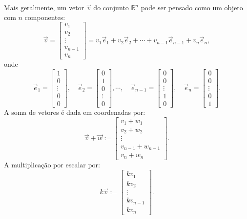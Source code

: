 \documentclass[../livro.tex]{subfiles}  %
\begin{document}
Mais geralmente, um vetor $\vec{v}$ do conjunto $\mathbb{R}^n$ pode ser pensado como um objeto com $n$ componentes:
\begin{equation}
\vec{v} =
\left[
  \begin{array}{c}
    v_1 \\
    v_2 \\
   \vdots \\
    v_{n-1} \\
    v_n
  \end{array}
\right]
= v_1 \vec{e}_1 + v_2 \vec{e}_2 + \cdots + v_{n-1} \vec{e}_{n-1} + v_{n} \vec{e}_{n},
\end{equation} onde
\begin{equation}
\vec{e}_1 =
\left[
  \begin{array}{c}
    1 \\
    0 \\
  \vdots \\
    0 \\
    0
  \end{array}
\right], \quad
\vec{e}_2 =
\left[
  \begin{array}{c}
    0 \\
    1 \\
    0 \\
  \vdots \\
    0
  \end{array}
\right],   \cdots, \quad
\vec{e}_{n-1} =
\left[
  \begin{array}{c}
    0 \\
    0 \\
  \vdots \\
    1 \\
    0
  \end{array}
\right], \quad
\vec{e}_n =
\left[
  \begin{array}{c}
    0 \\
    0 \\
  \vdots \\
    0 \\
    1
  \end{array}
\right].
\end{equation} A soma de vetores é dada em coordenadas por:
\begin{equation}
\vec{v} + \vec{w} :=
\left[
  \begin{array}{c}
    v_1 + w_1 \\
    v_2 + w_2 \\
    \vdots \\
    v_{n-1} + w_{n-1} \\
    v_n + w_n
  \end{array}
\right].
\end{equation} A multiplicação por escalar por:
\begin{equation}
k \vec{v} :=
\left[
  \begin{array}{c}
    k v_1 \\
    k v_2 \\
    \vdots \\
    k v_{n-1} \\
    k v_n
  \end{array}
\right].
\end{equation}
\end{document}
